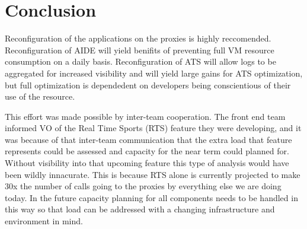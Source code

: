 \documentclass{article}
\begin{document}
\section{Conclusion}
\label{SECTION-Conclusion}
Reconfiguration of the applications on the proxies is highly reccomended. Reconfiguration of AIDE will yield benifits of preventing full VM resource consumption on a daily basis. Reconfiguration of ATS will allow logs to be aggregated for increased visibility and will yield large gains for ATS optimization, but full optimization is dependedent on developers being conscientious of their use of the resource. 

This effort was made possible by inter-team cooperation. The front end team informed VO of the Real Time Sports (RTS) feature they were developing, and it was because of that inter-team communication that the extra load that feature represents could be assessed and capacity for the near term could planned for. Without visibility into that upcoming feature this type of analysis would have been wildly innacurate. This is because RTS alone is currently projected to make 30x the number of calls going to the proxies by everything else we are doing today. In the future capacity planning for all components needs to be handled in this way so that load can be addressed with a changing infrastructure and environment in mind. 
\end{document}
